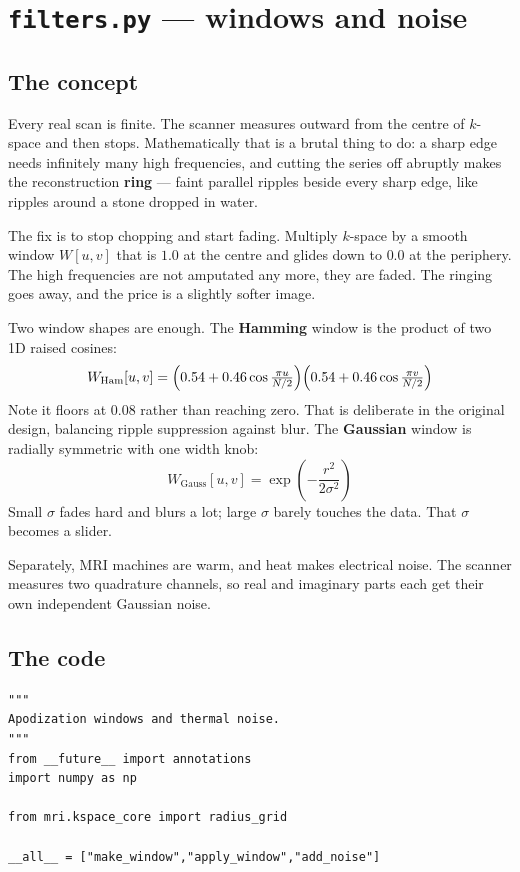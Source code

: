 \documentclass[11pt,a4paper]{article}
\begin{document}
\section{\texttt{filters.py} --- windows and noise}

\subsection{The concept}

Every real scan is finite. The scanner measures outward from the centre of
$k$-space and then stops. Mathematically that is a brutal thing to do: a sharp
edge needs infinitely many high frequencies, and cutting the series off abruptly
makes the reconstruction \textbf{ring} --- faint parallel ripples beside every
sharp edge, like ripples around a stone dropped in water.

The fix is to stop chopping and start fading. Multiply $k$-space by a smooth
window $W[u,v]$ that is $1.0$ at the centre and glides down to $0.0$ at the
periphery. The high frequencies are not amputated any more, they are faded. The
ringing goes away, and the price is a slightly softer image.

Two window shapes are enough. The \textbf{Hamming} window is the product of two
1D raised cosines:
\[
W_{\text{Ham}}[u,v] = \Bigl(0.54 + 0.46\cos\tfrac{\pi u}{N/2}\Bigr)
                      \Bigl(0.54 + 0.46\cos\tfrac{\pi v}{N/2}\Bigr)
\]
Note it floors at $0.08$ rather than reaching zero. That is deliberate in the
original design, balancing ripple suppression against blur. The
\textbf{Gaussian} window is radially symmetric with one width knob:
\[
W_{\text{Gauss}}[u,v] = \exp\!\left(-\frac{r^2}{2\sigma^2}\right)
\]
Small $\sigma$ fades hard and blurs a lot; large $\sigma$ barely touches the
data. That $\sigma$ becomes a slider.

Separately, MRI machines are warm, and heat makes electrical noise. The scanner
measures two quadrature channels, so real and imaginary parts each get their own
independent Gaussian noise.

\subsection{The code}

\begin{lstlisting}
"""
Apodization windows and thermal noise.
"""
from __future__ import annotations
import numpy as np

from mri.kspace_core import radius_grid

__all__ = ["make_window","apply_window","add_noise"]
\end{lstlisting}
\end{document}
